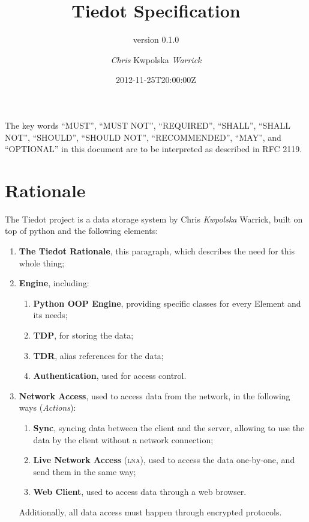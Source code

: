 \documentclass[a4paper,english]{paper}
\date{}
\providecommand{\\}{\\}
\newcommand{\version}{0.1.0}
\begin{document}
\title{Tiedot Specification}
\subtitle{version \version}
\author{\emph{Chris }Kwpolska\emph{ Warrick}}
\date{2012-11-25T20:00:00Z}

\maketitle
{}

\textsf{The key words ``MUST'', ``MUST NOT'', ``REQUIRED'', ``SHALL'', ``SHALL
    NOT'', ``SHOULD'', ``SHOULD NOT'', ``RECOMMENDED'',  ``MAY'', and ``OPTIONAL''
in this document are to be interpreted as described in RFC 2119.}

\tableofcontents




\pagebreak
{}
\setcounter{page}{1}
\part{Rationale}
\label{Rationale}

The Tiedot project is a data storage system by Chris \emph{Kwpolska} Warrick,
built on top of python and the following elements:
\begin{enumerate}
    \item \textbf{The Tiedot Rationale}, this paragraph, which describes the need for
        this whole thing;
    \item \textbf{Engine}, including:
        \begin{enumerate}[(1)]
            \item \textbf{Python OOP Engine}, providing specific classes for every
                Element and its needs;
            \item \textbf{TDP}, for storing the data;
            \item \textbf{TDR}, alias references for the data;
            \item \textbf{Authentication}, used for access control.
        \end{enumerate}
    \item \textbf{Network Access}, used to  access data from the network, in the
        following ways (\emph{Actions}):
        \begin{enumerate}[(1)]
            \item \textbf{Sync}, syncing data between the client and the
                server, allowing to use the data by the client without a
                network connection;
            \item \textbf{Live Network Access} (\textsc{lna}), used to access
                the data one-by-one, and send them in the same way;
            \item \textbf{Web Client}, used to access data through a web browser.
        \end{enumerate}
        Additionally, all data access must happen through encrypted protocols.
\end{enumerate}
\end{document}
